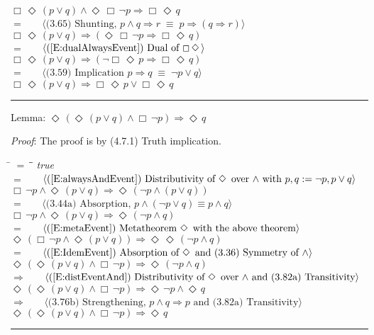\documentclass[12pt, fleqn, leqno]{article}
\newcommand{\lgap}{2pt}                             %
\newcommand{\mymathindent}{24pt}                    %
\newcommand{\equivs}{\ensuremath{\;\equiv\;}}       %
\newcommand{\impl}{\ensuremath{\Rightarrow}}        %
\newcommand{\Event}{\Diamond\,}
\newcommand{\Always}{\Box\,}
\newcommand{\myqed}{\rule[-.23ex]{1.2ex}{2.0ex}}
\newcommand{\myqedtab}{\hspace{384pt}}              %
\newcommand{\Gll} {\langle}                         %
\newcommand{\Ggg} {\rangle}                         %
\newcommand{\Hint}[1]     {\ \ \ $\Gll              \mbox{#1} \Ggg$ }   %
\begin{document}
{\begin{tabbing}
  \> \>   $\Always \Event(p\lor q) \land \Event\Always \neg p \impl \Always\Event q$\\[\lgap]
  \> $=$  \>  \Hint{(3.65) Shunting, $p\land q\impl r\equivs p\impl (q\impl r)$}\\[\lgap]
  \> \>   $\Always \Event(p\lor q) \impl (\Event\Always \neg p \impl \Always\Event q)$\\[\lgap]
  \> $=$  \>  \Hint{(\ref{E:dualAlwaysEvent}) Dual of $\Always\Event$}\\[\lgap]
  \> \>   $\Always \Event(p\lor q) \impl (\neg\Always\Event p \impl \Always\Event q)$\\[\lgap]
	\> $=$  \>  \Hint{(3.59) Implication $p\impl q \equivs \neg p \lor q$}\\[\lgap]
  \> \>   $\Always \Event(p\lor q) \impl \Always\Event p \lor \Always\Event q$ \quad \myqed
\end{tabbing}
Lemma: $\Event (\Event(p\lor q) \land \Always\neg p)\impl\Event q$

\emph{Proof}: The proof is by (4.7.1) Truth implication.
\begin{tabbing}
\hspace{\mymathindent} \= $= \;$ \= \myqedtab \= \kill
  \> \>   \textit{true}\\[\lgap]
  \> $=$  \>  \Hint{(\ref{E:alwaysAndEvent}) Distributivity of $\Event$ over $\land$ with $p,q:=\neg p, p\lor q$}\\[\lgap]
  \> \>   $\Always \neg p \land \Event (p\lor q) \impl \Event (\neg p \land (p\lor q))$\\[\lgap]
  \> $=$ \> \Hint{(3.44a) Absorption, $p\land (\neg p\lor q)\equiv p\land q$}\\[\lgap]
  \> \>   $\Always \neg p \land \Event (p\lor q) \impl \Event (\neg p \land q)$\\[\lgap]
  \> $=$ \> \Hint{(\ref{E:metaEvent}) Metatheorem $\Event$ with the above theorem}\\[\lgap]
  \> \>   $\Event(\Always \neg p \land \Event (p\lor q)) \impl \Event\Event (\neg p \land q)$\\[\lgap]
  \> $=$  \>  \Hint{(\ref{E:IdemEvent}) Absorption of $\Event$ and (3.36) Symmetry of $\land$}\\[\lgap]
  \> \>   $\Event(\Event (p\lor q) \land \Always \neg p) \impl \Event (\neg p \land q)$\\[\lgap]
  \> $\impl$  \>  \Hint{(\ref{E:distEventAnd}) Distributivity of $\Event$ over $\land$ and (3.82a) Transitivity}\\[\lgap]
  \> \>   $\Event(\Event (p\lor q) \land \Always \neg p) \impl \Event \neg p \land \Event q$\\[\lgap]
  \> $\impl$  \> \Hint{(3.76b) Strengthening, $p\land q \impl p$ and (3.82a) Transitivity}\\[\lgap]
  \> \>   $\Event(\Event (p\lor q) \land \Always \neg p) \impl \Event q$ \quad \myqed
\end{tabbing}
}
\end{document}
